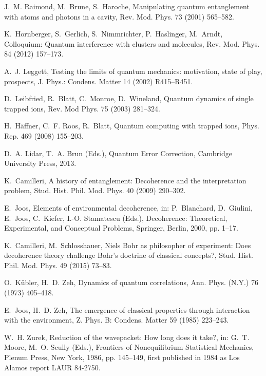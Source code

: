 \documentclass[3p,sort&compress,12pt]{elsarticle}
\begin{document}
\begin{thebibliography}{100}
J.~M. Raimond, M.~Brune, S.~Haroche, Manipulating quantum entanglement with
  atoms and photons in a cavity, Rev. Mod. Phys. 73 (2001) 565--582.

K.~Hornberger, S.~Gerlich, S.~Nimmrichter, P.~Haslinger, M.~Arndt, Colloquium:
  Quantum interference with clusters and molecules, Rev. Mod. Phys. 84 (2012)
  157--173.

A.~J. Leggett, Testing the limits of quantum mechanics: motivation, state of
  play, prospects, J. Phys.: Condens. Matter 14 (2002) R415--R451.

D.~Leibfried, R.~Blatt, C.~Monroe, D.~Wineland, Quantum dynamics of single
  trapped ions, Rev. Mod Phys. 75 (2003) 281--324.

H.~H{\"a}ffner, C.~F. Roos, R.~Blatt, Quantum computing with trapped ions,
  Phys. Rep. 469 (2008) 155--203.

D.~A. Lidar, T.~A. Brun (Eds.), Quantum Error Correction, Cambridge University
  Press, 2013.

K.~Camilleri, A history of entanglement: {D}ecoherence and the interpretation
  problem, Stud. Hist. Phil. Mod. Phys. 40 (2009) 290--302.

E.~Joos, Elements of environmental decoherence, in: P.~Blanchard, D.~Giulini,
  E.~Joos, C.~Kiefer, I.-O. Stamatescu (Eds.), Decoherence: Theoretical,
  Experimental, and Conceptual Problems, Springer, Berlin, 2000, pp. 1--17.

K.~Camilleri, M.~Schlosshauer, Niels {B}ohr as philosopher of experiment:
  {D}oes decoherence theory challenge {B}ohr's doctrine of classical concepts?,
  Stud. Hist. Phil. Mod. Phys. 49 (2015) 73--83.

O.~K{\"u}bler, H.~D. Zeh, Dynamics of quantum correlations, Ann. Phys. (N.Y.)
  76 (1973) 405--418.

E.~Joos, H.~D. Zeh, The emergence of classical properties through interaction
  with the environment, Z. Phys. B: Condens. Matter 59 (1985) 223--243.

W.~H. Zurek, Reduction of the wavepacket: {H}ow long does it take?, in: G.~T.
  Moore, M.~O. Scully (Eds.), Frontiers of Nonequilibrium Statistical
  Mechanics, Plenum Press, New York, 1986, pp. 145--149, first published in
  1984 as Los Alamos report LAUR 84-2750.


\end{thebibliography}
\end{document}
